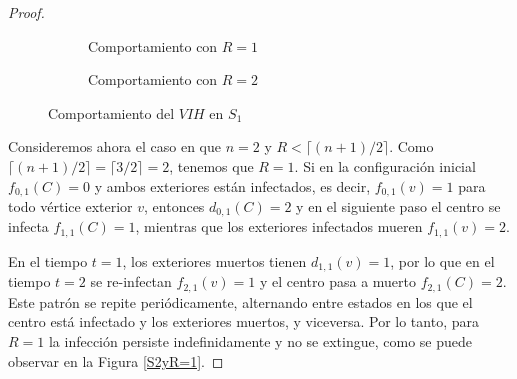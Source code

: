 \documentclass[12pt,titlepage,twoside,openright]{book}
\begin{document}
\begin{proof}
\begin{figure}[h]
\begin{subfigure}[h]{0.65\linewidth}
    \caption{Comportamiento con $R=1$}
    \label{S1yR=1}
    \end{subfigure}
    \begin{subfigure}[h]{0.5\linewidth}
    \caption{Comportamiento con $R=2$}
    \label{S1yR=2}
    \end{subfigure}
    \caption{Comportamiento del $VIH$ en $S_1$}
    \label{S1}
    \end{figure}
    Consideremos ahora el caso en que $n=2$ y $R<\lceil (n+1)/2\rceil$. Como $\lceil (n+1)/2\rceil=\lceil 3/2\rceil=2$, tenemos que $R=1$. Si en la configuraci\'on inicial $f_{0,1}(C)=0$ y ambos exteriores est\'an infectados, es decir, $f_{0,1}(v)=1$ para todo v\'ertice exterior $v$, entonces $d_{0,1}(C)=2$ y en el siguiente paso el centro se infecta $f_{1,1}(C)=1$, mientras que los exteriores infectados mueren $f_{1,1}(v)=2$. 
    
    En el tiempo $t=1$, los exteriores muertos tienen $d_{1,1}(v)=1$, por lo que en el tiempo $t=2$ se re-infectan $f_{2,1}(v)=1$ y el centro pasa a muerto $f_{2,1}(C)=2$. Este patr\'on se repite peri\'odicamente, alternando entre estados en los que el centro est\'a infectado y los exteriores muertos, y viceversa. Por lo tanto, para $R=1$ la infecci\'on persiste indefinidamente y no se extingue, como se puede observar en la Figura \ref{S2yR=1}. 
    

\end{proof}
\end{document}
